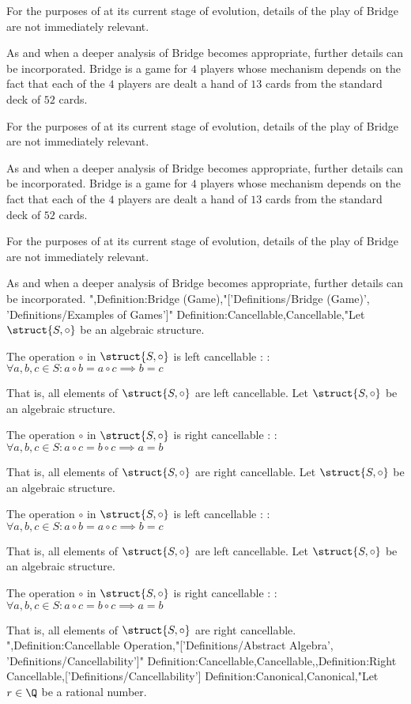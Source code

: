 For the purposes of  at its current stage of evolution, details of the play of Bridge are not immediately relevant.

As and when a deeper analysis of Bridge becomes appropriate, further details can be incorporated.
Bridge is a game for $4$ players whose mechanism depends on the fact that each of the $4$ players are dealt a hand of $13$ cards from the standard deck of $52$ cards.


For the purposes of  at its current stage of evolution, details of the play of Bridge are not immediately relevant.

As and when a deeper analysis of Bridge becomes appropriate, further details can be incorporated.
Bridge is a game for $4$ players whose mechanism depends on the fact that each of the $4$ players are dealt a hand of $13$ cards from the standard deck of $52$ cards.


For the purposes of  at its current stage of evolution, details of the play of Bridge are not immediately relevant.

As and when a deeper analysis of Bridge becomes appropriate, further details can be incorporated.
",Definition:Bridge (Game),"['Definitions/Bridge (Game)', 'Definitions/Examples of Games']"
Definition:Cancellable,Cancellable,"Let $\struct {S, \circ}$ be an algebraic structure.


The operation $\circ$ in $\struct {S, \circ}$ is left cancellable :
:$\forall a, b, c \in S: a \circ b = a \circ c \implies b = c$

That is,  all elements of $\struct {S, \circ}$ are left cancellable.
Let $\struct {S, \circ}$ be an algebraic structure.


The operation $\circ$ in $\struct {S, \circ}$ is right cancellable :
:$\forall a, b, c \in S: a \circ c = b \circ c \implies a = b$

That is,  all elements of $\struct {S, \circ}$ are right cancellable.
Let $\struct {S, \circ}$ be an algebraic structure.


The operation $\circ$ in $\struct {S, \circ}$ is left cancellable :
:$\forall a, b, c \in S: a \circ b = a \circ c \implies b = c$

That is,  all elements of $\struct {S, \circ}$ are left cancellable.
Let $\struct {S, \circ}$ be an algebraic structure.


The operation $\circ$ in $\struct {S, \circ}$ is right cancellable :
:$\forall a, b, c \in S: a \circ c = b \circ c \implies a = b$

That is,  all elements of $\struct {S, \circ}$ are right cancellable.
",Definition:Cancellable Operation,"['Definitions/Abstract Algebra', 'Definitions/Cancellability']"
Definition:Cancellable,Cancellable,,Definition:Right Cancellable,['Definitions/Cancellability']
Definition:Canonical,Canonical,"Let $r \in \Q$ be a rational number.

